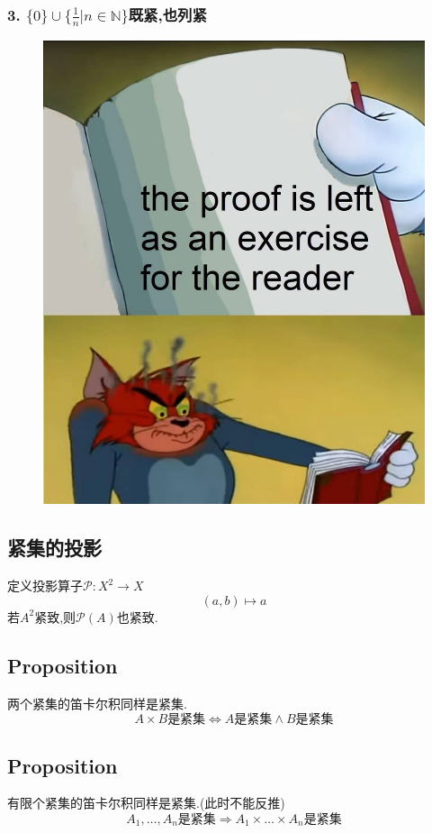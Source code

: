 \documentclass[12pt, a4paper, oneside]{ctexbook}
\begin{document}
  \subsubsection{3.  $\{0\}\cup \{\frac{1}{n}|n\in\mathbb{N}\}$既紧,也列紧}
  \begin{figure}[H]%
    \centering
    \includegraphics[scale=0.2]{证明留给读者.jpg}
  \end{figure}
  \subsection{紧集的投影}
  定义投影算子$\mathcal{P}:X^2\rightarrow X$
  $$
  (a,b)\mapsto a
  $$
  若$A^2$紧致,则$\mathcal{P}(A)$也紧致.
  \subsection{Proposition}
  两个紧集的笛卡尔积同样是紧集.
  $$
  A\times B\text{是紧集}\Leftrightarrow A\text{是紧集}\land B\text{是紧集}
  $$
  \subsection{Proposition}
  有限个紧集的笛卡尔积同样是紧集.(此时不能反推)
  $$
  A_1,\dots,A_n\text{是紧集}\Rightarrow A_1\times \dots\times A_n\text{是紧集}
  $$
\end{document}
